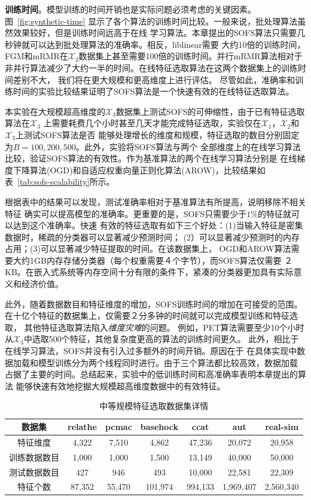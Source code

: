 \documentclass[doctor]{ustcthesis}
\def \X {\mathcal{X}}
\begin{document}
\textbf{训练时间}。模型训练的时间开销也是实际问题必须考虑的关键因素。图~\ref{fig:synthetic-time}
显示了各个算法的训练时间比较。一般来说，批处理算法虽然效果较好，但是训练时间远高于在线
学习算法。本章提出的SOFS算法只需要几秒钟就可以达到批处理算法的准确率。相反，liblinear需要
大约10倍的训练时间，FGM和mRMR在$\X_2$数据集上甚至需要100倍的训练时间。并行mRMR算法相对于
非并行算法减少了大约一半的时间。在线特征选取算法在这两个数据集上的训练时间差别不大，
我们将在更大规模和更高维度上进行评估。
尽管如此，准确率和训练时间的实验比较结果证明了SOFS算法是一个快速有效的在线特征选取算法。


本实验在大规模超高维度的$\X_3$数据集上测试SOFS的可伸缩性，由于已有特征选取算法在$\X_3$
上需要耗费几个小时甚至几天才能完成特征选取，实验仅在$\X_1$，$\X_2$和$\X_3$上测试SOFS算法是否
能够处理增长的维度和规模，特征选取的数目分别固定为$B=100,200,500$。此外，实验将SOFS算法与两个
全部维度上的在线学习算法比较，验证SOFS算法的有效性。作为基准算法的两个在线学习算法分别是
在线梯度下降算法(OGD)和自适应权重向量正则化算法(AROW)，比较结果如表~\ref{tab:sofs-scalability}所示。

根据表中的结果可以发现，测试准确率相对于基准算法有所提高，说明移除不相关特征
确实可以提高模型的准确率。更重要的是，SOFS只需要少于$1\%$的特征就可以达到这个准确率。快速
有效的特征选取有如下三个好处：(1)当输入特征是密集数据时，稀疏的分类器可以显著减少预测时间；
(2）可以显著减少预测时的内存占用；(3)可以显著减少特征提取的时间。在该数据集上，
OGD和AROW算法需要大约1GB内存存储分类器（每个权重需要４个字节），而SOFS算法仅需要
２KB。在嵌入式系统等内存空间十分有限的条件下，紧凑的分类器更加具有实际意义和经济价值。


此外，随着数据数目和特征维度的增加，SOFS训练时间的增加在可接受的范围。
在十亿个特征的数据集上，仅需要２分多钟的时间就可以完成模型训练和特征选取，
其他特征选取算法陷入\emph{维度灾难}的问题。
例如，PET算法需要至少10个小时从$\X_3$中选取500个特征，其他复杂度更高的算法的训练时间更久。
此外，相比于在线学习算法，SOFS并没有引入过多额外的时间开销。原因在于
在具体实现中数据加载和模型训练分为两个线程同时进行。由于三个算法都比较高效，数据加载
占据了主要的时间。总结起来，实验中的低训练时间和高准确率表明本章提出的算法
能够快速有效地挖掘大规模超高维度数据中的有效特征。

\begin{table}[t]
    \centering
    \caption{中等规模特征选取数据集详情}
    \label{tab:sofs-medium-dataset}
    \begin{tabular}{|c|c|c|c|c|c|c|}
        \hline
        数据集 & relathe & pcmac & basehock & ccat & aut & real-sim \\ \hline
        特征维度 & 4,322 & 7,510 & 4,862 & 47,236 & 20,072 & 20,958 \\ \hline
        训练数据数目 & 1,000 & 1,000 & 1,500 & 13,149 & 40,000 & 50,000 \\ \hline
        测试数据数目 & 427 & 946 & 493 & 10,000 & 22,581 & 22,309 \\ \hline
        特征个数 & 87,352 & 55,470 & 101,974 & 994,133 & 1,969,407 & 2,560,340 \\ \hline
    \end{tabular}
\end{table}
\end{document}
